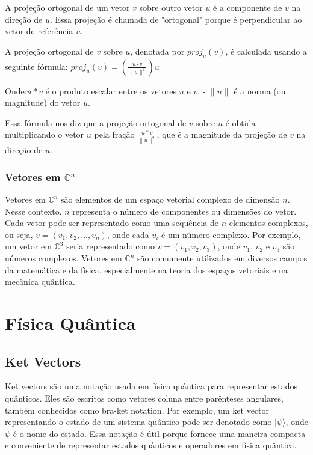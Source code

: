 \documentclass[12pt]{article}
\begin{document}
A projeção ortogonal de um vetor \(v\) sobre outro vetor \(u\) é a componente de \(v\) na direção de \(u\). Essa projeção é chamada de "ortogonal" porque é perpendicular ao vetor de referência \(u\).

A projeção ortogonal de \(v\) sobre \(u\), denotada por \(proj_{u}(v)\), é calculada usando a seguinte fórmula: \(proj_{u}(v) = \left( \frac{u \cdot v}{\|u\|^2} \right) u\)


Onde:\(u * v \) é o produto escalar entre os vetores \( u \) e \( v \).
- \( \| u \| \) é a norma (ou magnitude) do vetor \( u \).

Essa fórmula nos diz que a projeção ortogonal de \( v \) sobre \( u \) é obtida multiplicando o vetor \( u \) pela fração \(\frac{u*v}{\|u\|^2}\), que é a magnitude da projeção de \(v \) na direção de \(u\).

\subsubsection{Vetores em $\mathbb{C}^n$}

Vetores em $\mathbb{C}^n$ são elementos de um espaço vetorial complexo de dimensão $n$. Nesse contexto, $n$ representa o número de componentes ou dimensões do vetor. Cada vetor pode ser representado como uma sequência de $n$ elementos complexos, ou seja, $v = (v_1, v_2, \ldots, v_n)$, onde cada $v_i$ é um número complexo. Por exemplo, um vetor em $\mathbb{C}^3$ seria representado como $v = (v_1, v_2, v_3)$, onde $v_1$, $v_2$ e $v_3$ são números complexos. Vetores em $\mathbb{C}^n$ são comumente utilizados em diversos campos da matemática e da física, especialmente na teoria dos espaços vetoriais e na mecânica quântica.


\section{Física Quântica}

\subsection{Ket Vectors}


Ket vectors são uma notação usada em física quântica para representar estados quânticos. Eles são escritos como vetores coluna entre parênteses angulares, também conhecidos como bra-ket notation. Por exemplo, um ket vector representando o estado de um sistema quântico pode ser denotado como $|\psi\rangle$, onde $\psi$ é o nome do estado. Essa notação é útil porque fornece uma maneira compacta e conveniente de representar estados quânticos e operadores em física quântica.
\end{document}
